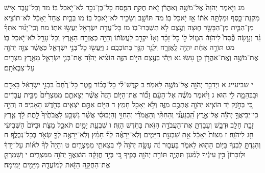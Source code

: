 \documentclass[twoside, openany, parskip=half, 11pt]{book}
\begin{document}
מג וַיֹּ֤אמֶר יְהֹוָה֙ אֶל־מֹשֶׁ֣ה וְאַהֲרֹ֔ן זֹ֖את חֻקַּ֣ת הַפָּ֑סַח כׇּל־בֶּן־נֵכָ֖ר לֹא־יֹ֥אכַל בּֽוֹ׃ מד וְכׇל־עֶ֥בֶד אִ֖ישׁ מִקְנַת־כָּ֑סֶף וּמַלְתָּ֣ה אֹת֔וֹ אָ֖ז יֹ֥אכַל בּֽוֹ׃ מה תּוֹשָׁ֥ב וְשָׂכִ֖יר לֹא־יֹ֥אכַל בּֽוֹ׃ מו בְּבַ֤יִת אֶחָד֙ יֵאָכֵ֔ל לֹא־תוֹצִ֧יא מִן־הַבַּ֛יִת מִן־הַבָּשָׂ֖ר ח֑וּצָה וְעֶ֖צֶם לֹ֥א תִשְׁבְּרוּ־בֽוֹ׃ מז כׇּל־עֲדַ֥ת יִשְׂרָאֵ֖ל יַעֲשׂ֥וּ אֹתֽוֹ׃ מח וְכִֽי־יָג֨וּר אִתְּךָ֜ גֵּ֗ר וְעָ֣שָׂה פֶ֘סַח֮ לַיהֹוָה֒ הִמּ֧וֹל ל֣וֹ כׇל־זָכָ֗ר וְאָז֙ יִקְרַ֣ב לַעֲשֹׂת֔וֹ וְהָיָ֖ה כְּאֶזְרַ֣ח הָאָ֑רֶץ וְכׇל־עָרֵ֖ל לֹֽא־יֹ֥אכַל בּֽוֹ׃ מט תּוֹרָ֣ה אַחַ֔ת יִהְיֶ֖ה לָֽאֶזְרָ֑ח וְלַגֵּ֖ר הַגָּ֥ר בְּתוֹכְכֶֽם׃ נ וַיַּֽעֲשׂ֖וּ כׇּל־בְּנֵ֣י יִשְׂרָאֵ֑ל כַּאֲשֶׁ֨ר צִוָּ֧ה יְהֹוָ֛ה אֶת־מֹשֶׁ֥ה וְאֶֽת־אַהֲרֹ֖ן כֵּ֥ן עָשֽׂוּ׃
נא וַיְהִ֕י בְּעֶ֖צֶם הַיּ֣וֹם הַזֶּ֑ה הוֹצִ֨יא יְהֹוָ֜ה אֶת־בְּנֵ֧י יִשְׂרָאֵ֛ל מֵאֶ֥רֶץ מִצְרַ֖יִם עַל־צִבְאֹתָֽם׃

י שביעייג א וַיְדַבֵּ֥ר יְהֹוָ֖ה אֶל־מֹשֶׁ֥ה לֵּאמֹֽר׃ ב קַדֶּשׁ־לִ֨י כׇל־בְּכ֜וֹר פֶּ֤טֶר כׇּל־רֶ֙חֶם֙ בִּבְנֵ֣י יִשְׂרָאֵ֔ל בָּאָדָ֖ם וּבַבְּהֵמָ֑ה לִ֖י הֽוּא׃ ג וַיֹּ֨אמֶר מֹשֶׁ֜ה אֶל־הָעָ֗ם זָכ֞וֹר אֶת־הַיּ֤וֹם הַזֶּה֙ אֲשֶׁ֨ר יְצָאתֶ֤ם מִמִּצְרַ֙יִם֙ מִבֵּ֣ית עֲבָדִ֔ים כִּ֚י בְּחֹ֣זֶק יָ֔ד הוֹצִ֧יא יְהֹוָ֛ה אֶתְכֶ֖ם מִזֶּ֑ה וְלֹ֥א יֵאָכֵ֖ל חָמֵֽץ׃ ד הַיּ֖וֹם אַתֶּ֣ם יֹצְאִ֑ים בְּחֹ֖דֶשׁ הָאָבִֽיב׃ ה וְהָיָ֣ה כִֽי־יְבִיאֲךָ֣ יְהֹוָ֡ה אֶל־אֶ֣רֶץ הַֽ֠כְּנַעֲנִ֠י וְהַחִתִּ֨י וְהָאֱמֹרִ֜י וְהַחִוִּ֣י וְהַיְבוּסִ֗י אֲשֶׁ֨ר נִשְׁבַּ֤ע לַאֲבֹתֶ֙יךָ֙ לָ֣תֶת לָ֔ךְ אֶ֛רֶץ זָבַ֥ת חָלָ֖ב וּדְבָ֑שׁ וְעָבַדְתָּ֛ אֶת־הָעֲבֹדָ֥ה הַזֹּ֖את בַּחֹ֥דֶשׁ הַזֶּֽה׃ ו שִׁבְעַ֥ת יָמִ֖ים תֹּאכַ֣ל מַצֹּ֑ת וּבַיּוֹם֙ הַשְּׁבִיעִ֔י חַ֖ג לַיהֹוָֽה׃ ז מַצּוֹת֙ יֵֽאָכֵ֔ל אֵ֖ת שִׁבְעַ֣ת הַיָּמִ֑ים וְלֹֽא־יֵרָאֶ֨ה לְךָ֜ חָמֵ֗ץ וְלֹֽא־יֵרָאֶ֥ה לְךָ֛ שְׂאֹ֖ר בְּכׇל־גְּבֻלֶֽךָ׃ ח וְהִגַּדְתָּ֣ לְבִנְךָ֔ בַּיּ֥וֹם הַה֖וּא לֵאמֹ֑ר בַּעֲב֣וּר זֶ֗ה עָשָׂ֤ה יְהֹוָה֙ לִ֔י בְּצֵאתִ֖י מִמִּצְרָֽיִם׃ ט וְהָיָה֩ לְךָ֨ לְא֜וֹת עַל־יָדְךָ֗ וּלְזִכָּרוֹן֙ בֵּ֣ין עֵינֶ֔יךָ לְמַ֗עַן תִּהְיֶ֛ה תּוֹרַ֥ת יְהֹוָ֖ה בְּפִ֑יךָ כִּ֚י בְּיָ֣ד חֲזָקָ֔ה הוֹצִֽאֲךָ֥ יְהֹוָ֖ה מִמִּצְרָֽיִם׃ י וְשָׁמַרְתָּ֛ אֶת־הַחֻקָּ֥ה הַזֹּ֖את לְמוֹעֲדָ֑הּ מִיָּמִ֖ים יָמִֽימָה׃
\end{document}
